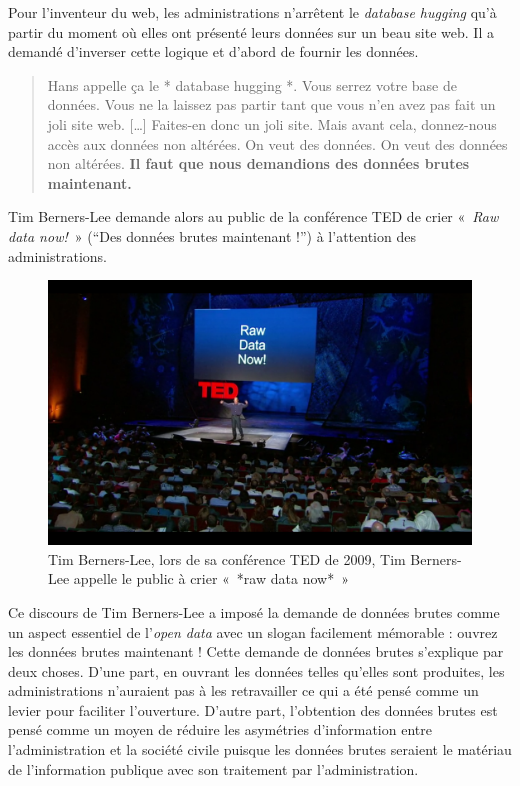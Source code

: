 \documentclass[]{book}
\theoremstyle{definition}
\theoremstyle{definition}
\theoremstyle{definition}
\theoremstyle{remark}
\begin{document}
Pour l'inventeur du web, les administrations n'arrêtent le
\emph{database hugging} qu'à partir du moment où elles ont présenté
leurs données sur un beau site web. Il a demandé d'inverser cette
logique et d'abord de fournir les données.

\begin{quote}
Hans appelle ça le * database hugging *. Vous serrez votre base de
données. Vous ne la laissez pas partir tant que vous n'en avez pas fait
un joli site web. {[}\ldots{}{]} Faites-en donc un joli site. Mais avant
cela, donnez-nous accès aux données non altérées. On veut des données.
On veut des données non altérées. \textbf{Il faut que nous demandions
des données brutes maintenant.}
\end{quote}

Tim Berners-Lee demande alors au public de la conférence TED de crier
«~\emph{Raw data now!}~» (``Des données brutes maintenant !'') à
l'attention des administrations.

\begin{figure}

{\centering \includegraphics[width=0.7\linewidth]{./img/raw} 

}

\caption{Tim Berners-Lee, lors de sa conférence TED de 2009, Tim Berners-Lee appelle le public à crier « *raw data now* »}\label{fig:unnamed-chunk-3}
\end{figure}

Ce discours de Tim Berners-Lee a imposé la demande de données brutes
comme un aspect essentiel de l'\emph{open data} avec un slogan
facilement mémorable : ouvrez les données brutes maintenant ! Cette
demande de données brutes s'explique par deux choses. D'une part, en
ouvrant les données telles qu'elles sont produites, les administrations
n'auraient pas à les retravailler ce qui a été pensé comme un levier
pour faciliter l'ouverture. D'autre part, l'obtention des données brutes
est pensé comme un moyen de réduire les asymétries d'information entre
l'administration et la société civile puisque les données brutes
seraient le matériau de l'information publique avec son traitement par
l'administration.
\end{document}
